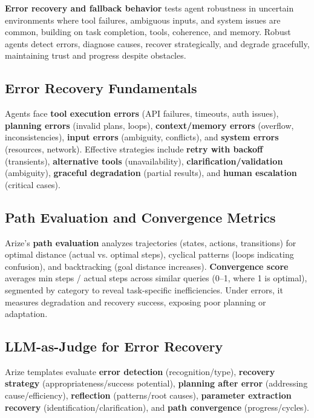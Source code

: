 \begin{TNtwocol}
\textbf{Error recovery and fallback behavior} tests agent robustness in uncertain environments where tool failures, ambiguous inputs, and system issues are common, building on task completion, tools, coherence, and memory. Robust agents detect errors, diagnose causes, recover strategically, and degrade gracefully, maintaining trust and progress despite obstacles.
​

\subsection*{Error Recovery Fundamentals}

Agents face \textbf{tool execution errors} (API failures, timeouts, auth issues), \textbf{planning errors} (invalid plans, loops), \textbf{context/memory errors} (overflow, inconsistencies), \textbf{input errors} (ambiguity, conflicts), and \textbf{system errors} (resources, network). Effective strategies include \textbf{retry with backoff} (transients), \textbf{alternative tools} (unavailability), \textbf{clarification/validation} (ambiguity), \textbf{graceful degradation} (partial results), and \textbf{human escalation} (critical cases).
​

\subsection*{Path Evaluation and Convergence Metrics}

Arize’s \textbf{path evaluation} analyzes trajectories (states, actions, transitions) for optimal distance (actual vs. optimal steps), cyclical patterns (loops indicating confusion), and backtracking (goal distance increases). \textbf{Convergence score} averages min steps / actual steps across similar queries (0–1, where 1 is optimal), segmented by category to reveal task-specific inefficiencies. Under errors, it measures degradation and recovery success, exposing poor planning or adaptation.

\subsection*{LLM-as-Judge for Error Recovery}

Arize templates evaluate \textbf{error detection} (recognition/type), \textbf{recovery strategy} (appropriateness/success potential), \textbf{planning after error} (addressing cause/efficiency), \textbf{reflection} (patterns/root causes), \textbf{parameter extraction recovery} (identification/clarification), and \textbf{path convergence} (progress/cycles).
​


\end{TNtwocol}

